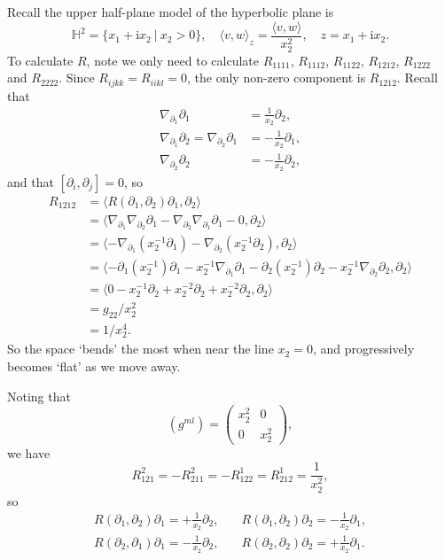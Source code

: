 \documentclass[letter-paper]{tufte-book}
\newenvironment{example}[1][Example]{\begin{trivlist}
\item[\hskip \labelsep {\bfseries #1}]}{\end{trivlist}}
\begin{document}
\begin{example}
  Recall the upper half-plane model of the hyperbolic plane is
  \begin{equation*}
    \mathbb{H}^2 = \{x_1 + \mathrm{i}x_2\ |\ x_2>0\}, \quad \langle v,w\rangle_z = \frac{\langle v,w\rangle}{x_2^2}, \quad z = x_1 + \mathrm{i}x_2.
  \end{equation*}
  To calculate $R$, note we only need to calculate $R_{1111}$, $R_{1112}$, $R_{1122}$, $R_{1212}$, $R_{1222}$ and $R_{2222}$. Since $R_{ijkk} = R_{iikl} = 0$, the only non-zero component is $R_{1212}$. Recall that
  \begin{align*}
    \nabla_{\partial_1}\partial_1 &= \frac{1}{x_2}\partial_2,\\
    \nabla_{\partial_1}\partial_2 = \nabla_{\partial_2}\partial_1 &= -\frac{1}{x_2}\partial_1,\\
    \nabla_{\partial_2}\partial_2 &= -\frac{1}{x_2}\partial_2,
  \end{align*}
  and that $[\partial_i, \partial_j] = 0$, so
  \begin{align*}
    R_{1212} 
      &= \langle R(\partial_1, \partial_2)\partial_1, \partial_2 \rangle\\
      &= \langle \nabla_{\partial_1}\nabla_{\partial_2}\partial_1 - \nabla_{\partial_2}\nabla_{\partial_1}\partial_1 - 0, \partial_2\rangle\\
      &= \langle -\nabla_{\partial_1} (x_2^{-1} \partial_1) - \nabla_{\partial_2} (x_2^{-1} \partial_2), \partial_2\rangle\\
      &= \langle -\partial_1(x_2^{-1}) \partial_1 - x_2^{-1}\nabla_{\partial_1} \partial_1 - \partial_2(x_2^{-1}) \partial_2 - x_2^{-1} \nabla_{\partial_2}\partial_2, \partial_2\rangle\\
      &= \langle 0 - x_2^{-1}\partial_2 + x_2^{-2} \partial_2 + x_2^{-2}\partial_2, \partial_2 \rangle\\
      &= g_{22} / x_2^2 \\
      &= 1 / x_2^4.
  \end{align*}
  So the space `bends' the most when near the line $x_2=0$, and progressively becomes `flat' as we move away.
  
  Noting that
  \begin{equation*}
    (g^{ml}) = \begin{pmatrix} x_2^2 & 0 \\ 0 & x_2^2\end{pmatrix},
  \end{equation*}
  we have
  \begin{equation*}
    R_{121}^2 = -R_{211}^2 = -R_{122}^1 = R_{212}^1 = \frac{1}{x_2^2},
  \end{equation*}
  so
  \begin{align*}
    R(\partial_1, \partial_2)\partial_1 = +\frac{1}{x_2}\partial_2, &\quad  R(\partial_1, \partial_2)\partial_2 = -\frac{1}{x_2}\partial_1,\\
    R(\partial_2, \partial_1)\partial_1 = -\frac{1}{x_2}\partial_2, &\quad  R(\partial_2, \partial_2)\partial_2 = +\frac{1}{x_2}\partial_1.
  \end{align*}
\end{example}
\end{document}
